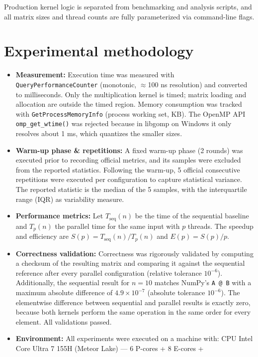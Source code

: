 \documentclass[12pt,a4paper]{article}
\begin{document}
Production kernel logic is separated from benchmarking and analysis
scripts, and all matrix sizes and thread counts are fully parameterized via
command-line flags.

\section{Experimental methodology}
\label{sec:method}

\begin{itemize}
\item \textbf{Measurement:} Execution time was measured with
\texttt{QueryPerformanceCounter} (monotonic, $\approx$100 ns resolution) and
converted to milliseconds. Only the multiplication kernel is timed; matrix
loading and allocation are outside the timed region. Memory consumption was
tracked with \texttt{GetProcessMemoryInfo} (process working set, KB). The
OpenMP API \texttt{omp\_get\_wtime()} was rejected because in libgomp on
Windows it only resolves about 1 ms, which quantizes the smaller sizes.
\item \textbf{Warm-up phase \& repetitions:} A fixed warm-up phase
(2 rounds) was executed prior to recording official metrics, and its samples
were excluded from the reported statistics. Following the warm-up, 5
official consecutive repetitions were executed per configuration to capture
statistical variance. The reported statistic is the median of the 5 samples,
with the interquartile range (IQR) as variability measure.
\item \textbf{Performance metrics:} Let $T_{\mathrm{seq}}(n)$ be the time of
the sequential baseline and $T_p(n)$ the parallel time for the same input
with $p$ threads. The speedup and efficiency are
$S(p) = T_{\mathrm{seq}}(n) / T_p(n)$ and $E(p) = S(p) / p$.
\item \textbf{Correctness validation:} Correctness was rigorously validated
by computing a checksum of the resulting matrix and comparing it against the
sequential reference after every parallel configuration (relative tolerance
$10^{-6}$). Additionally, the sequential result for $n = 10$ matches NumPy's
\texttt{A @ B} with a maximum absolute difference of $4.9 \times 10^{-7}$
(absolute tolerance $10^{-6}$). The elementwise difference between
sequential and parallel results is exactly zero, because both kernels
perform the same operation in the same order for every element. All
validations passed.
\item \textbf{Environment:} All experiments were executed on a machine
with: CPU Intel Core Ultra 7 155H (Meteor Lake) --- 6 P-cores + 8 E-cores +

\end{itemize}
\end{document}
